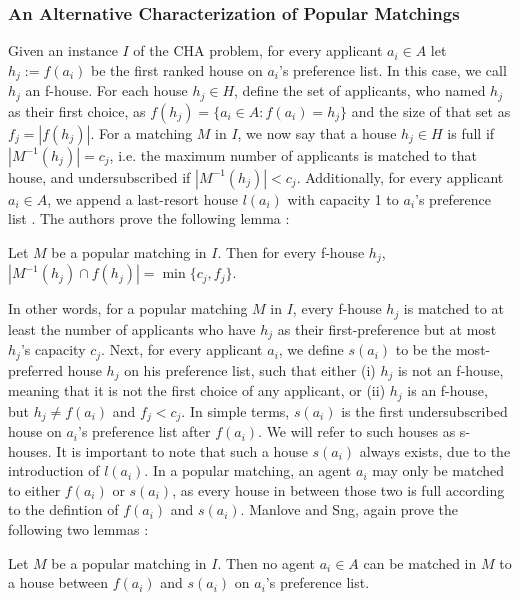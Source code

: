 \subsubsection{An Alternative Characterization of Popular Matchings}
Given an instance $I$ of the CHA problem, for every applicant $a_i \in A$ let $h_j := f(a_i)$ be the first ranked house on $a_i$'s preference list. In this case, we call $h_j$ an f-house. For each house $h_j \in H$, define the set of applicants, who named $h_j$ as their first choice, as $f(h_j) = \{a_i \in A: f(a_i) = h_j\}$ and the size of that set as $f_j = |f(h_j)|$. For a matching $M$ in $I$, we now say that a house $h_j \in H$ is full if $|M^{-1}(h_j)| = c_j$, i.e. the maximum number of applicants is matched to that house, and undersubscribed if $|M^{-1}(h_j)| < c_j$. Additionally, for every applicant $a_i \in A$, we append a last-resort house $l(a_i)$ with capacity 1 to $a_i$'s preference list \cite{ManlovePopularMatchings}. The authors prove the following lemma \cite{ManlovePopularMatchings}:
\newtheorem{lemma-popular-1}[theorem]{Lemma}
\begin{lemma}\label{lemma-popular1}
    Let $M$ be a popular matching in $I$. Then for every f-house $h_j$, $|M^{-1}(h_j) \cap f(h_j)| = \min\{c_j, f_j\}$.
\end{lemma} 
In other words, for a popular matching $M$ in $I$, every f-house $h_j$ is matched to at least the number of applicants who have $h_j$ as their first-preference but at most $h_j$'s capacity $c_j$. Next, for every applicant $a_i$, we define $s(a_i)$ to be the most-preferred house $h_j$ on his preference list, such that either (i) $h_j$  is not an f-house, meaning that it is not the first choice of any applicant, or (ii) $h_j$ is an f-house, but $h_j \neq f(a_i)$ and $f_j < c_j$. In simple terms, $s(a_i)$ is the first undersubscribed house on $a_i$'s preference list after $f(a_i)$. We will refer to such houses as s-houses. It is important to note that such a house $s(a_i)$ always exists, due to the introduction of $l(a_i)$. In a popular matching, an agent $a_i$ may only be matched to either $f(a_i)$ or $s(a_i)$, as every house in between those two is full according to the defintion of $f(a_i)$ and $s(a_i)$. Manlove and Sng, again prove the following two lemmas \cite{ManlovePopularMatchings}: 

\newtheorem{lemma-popular-2}[theorem]{Lemma}
\begin{lemma}\label{lemma-popular2}
    Let $M$ be a popular matching in $I$. Then no agent $a_i \in A$ can be matched in $M$ to a house between $f(a_i)$ and $s(a_i)$ on $a_i$'s preference list.
\end{lemma} 

